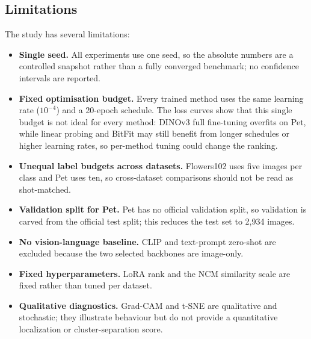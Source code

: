 \documentclass[journal,11pt]{IEEEtran}
\begin{document}
\subsection{Limitations}
The study has several limitations:
\begin{itemize}
  \setlength{\itemsep}{1pt}
  \item \textbf{Single seed.} All experiments use one seed, so the absolute numbers are a controlled snapshot rather than a fully converged benchmark; no confidence intervals are reported.
  \item \textbf{Fixed optimisation budget.} Every trained method uses the same learning rate ($10^{-4}$) and a 20-epoch schedule. The loss curves show that this single budget is not ideal for every method: DINOv3 full fine-tuning overfits on Pet, while linear probing and BitFit may still benefit from longer schedules or higher learning rates, so per-method tuning could change the ranking.
  \item \textbf{Unequal label budgets across datasets.} Flowers102 uses five images per class and Pet uses ten, so cross-dataset comparisons should not be read as shot-matched.
  \item \textbf{Validation split for Pet.} Pet has no official validation split, so validation is carved from the official test split; this reduces the test set to 2{,}934 images.
  \item \textbf{No vision-language baseline.} CLIP and text-prompt zero-shot are excluded because the two selected backbones are image-only.
  \item \textbf{Fixed hyperparameters.} LoRA rank and the NCM similarity scale are fixed rather than tuned per dataset.
  \item \textbf{Qualitative diagnostics.} Grad-CAM and t-SNE are qualitative and stochastic; they illustrate behaviour but do not provide a quantitative localization or cluster-separation score.
\end{itemize}
\end{document}
